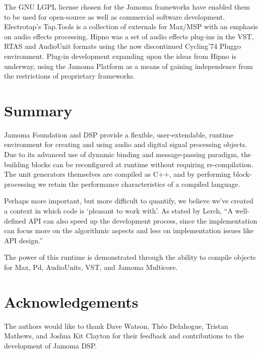 \documentclass[twoside,10pt]{article}
\begin{document}
The GNU LGPL license chosen for the Jamoma frameworks have enabled them to be used for open-source as well as commercial software development.  Electrotap's Tap.Tools \cite{web17} is a collection of externals for Max/MSP with an emphasis on audio effects processing.  Hipno \cite{Place:2005} was a set of audio effects plug-ins in the VST, RTAS and AudioUnit formats using the now discontinued Cycling'74 Pluggo environment.  Plug-in development expanding upon the ideas from Hipno is underway, using the Jamoma Platform as a means of gaining independence from the restrictions of proprietary frameworks.




\section{Summary} %

Jamoma Foundation and DSP provide a flexible, user-extendable, runtime environment for creating and using audio and digital signal processing objects.  Due to its advanced use of dynamic binding and message-passing paradigm, the building blocks can be reconfigured at runtime without requiring re-compilation.  The unit generators themselves are compiled as C++, and by performing block-processing we retain the performance characteristics of a compiled language.

Perhaps more important, but more difficult to quantify, we believe we've created a context in which code is `pleasant to work with'.  As stated by Lerch, ``A well-defined API can also speed up the development process, since the implementation can focus more on the algorithmic aspects and less on implementation issues like API design.'' \cite{Lerch:2005}

The power of this runtime is demonstrated through the ability to compile objects for Max, Pd, AudioUnits, VST, and Jamoma Multicore.




\section{Acknowledgements} %

The authors would like to thank Dave Watson, Th\'eo Delahogue, Tristan Mathews, and Joshua Kit Clayton for their feedback and contributions to the development of Jamoma DSP.
\end{document}
